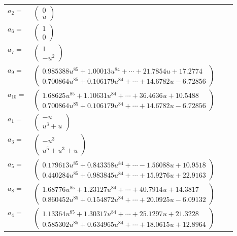 \documentclass[1p]{elsarticle_modified}
\theoremstyle{definition}
\begin{document}
\begin{tabular}{m{7pt} m{180pt} m{7pt} m{180pt} }
\flushright $a_{2}=$&$\begin{pmatrix}0\\u\end{pmatrix}$ \\
\flushright $a_{6}=$&$\begin{pmatrix}1\\0\end{pmatrix}$ \\
\flushright $a_{7}=$&$\begin{pmatrix}1\\- u^2\end{pmatrix}$ \\
\flushright $a_{9}=$&$\begin{pmatrix}0.985388 u^{85}+1.00013 u^{84}+\cdots+21.7854 u+17.2774\\0.700864 u^{85}+0.106179 u^{84}+\cdots+14.6782 u-6.72856\end{pmatrix}$ \\
\flushright $a_{10}=$&$\begin{pmatrix}1.68625 u^{85}+1.10631 u^{84}+\cdots+36.4636 u+10.5488\\0.700864 u^{85}+0.106179 u^{84}+\cdots+14.6782 u-6.72856\end{pmatrix}$ \\
\flushright $a_{1}=$&$\begin{pmatrix}- u\\u^3+u\end{pmatrix}$ \\
\flushright $a_{3}=$&$\begin{pmatrix}- u^3\\u^5+u^3+u\end{pmatrix}$ \\
\flushright $a_{5}=$&$\begin{pmatrix}0.179613 u^{85}+0.843358 u^{84}+\cdots-1.56088 u+10.9518\\0.440284 u^{85}+0.983845 u^{84}+\cdots+15.9276 u+22.9163\end{pmatrix}$ \\
\flushright $a_{8}=$&$\begin{pmatrix}1.68776 u^{85}+1.23127 u^{84}+\cdots+40.7914 u+14.3817\\0.860452 u^{85}+0.154872 u^{84}+\cdots+20.0925 u-6.09132\end{pmatrix}$ \\
\flushright $a_{4}=$&$\begin{pmatrix}1.13364 u^{85}+1.30317 u^{84}+\cdots+25.1297 u+21.3228\\0.585302 u^{85}+0.634965 u^{84}+\cdots+18.0615 u+12.8964\end{pmatrix}$ \\

\end{tabular}
\end{document}
